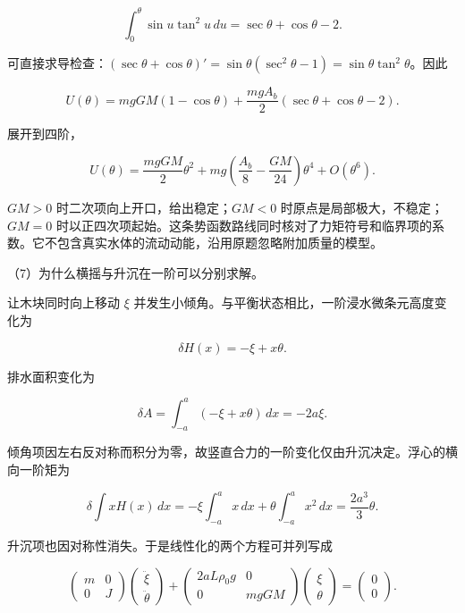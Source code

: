 \documentclass[12pt,a4paper,fontset=fandol]{ctexart}
\begin{document}
\[
\int_0^\theta\sin u\tan^2u\,du
=\sec\theta+\cos\theta-2.
\]

可直接求导检查：\((\sec\theta+\cos\theta)'=\sin\theta(\sec^2\theta-1)=\sin\theta\tan^2\theta\)。因此

\[
U(\theta)=mgGM(1-\cos\theta)
+\frac{mgA_b}{2}(\sec\theta+\cos\theta-2).
\]

展开到四阶，

\[
U(\theta)=\frac{mgGM}{2}\theta^2
+mg\left(\frac{A_b}{8}-\frac{GM}{24}\right)\theta^4
+O(\theta^6).
\]

\(GM>0\) 时二次项向上开口，给出稳定；\(GM<0\)
时原点是局部极大，不稳定；\(GM=0\)
时以正四次项起始。这条势函数路线同时核对了力矩符号和临界项的系数。它不包含真实水体的流动动能，沿用原题忽略附加质量的模型。

\par\noindent\begin{minipage}{\linewidth}
\setlength{\parindent}{2em}\setlength{\parskip}{.35em}
（7）为什么横摇与升沉在一阶可以分别求解。

让木块同时向上移动 \(\xi\)
并发生小倾角。与平衡状态相比，一阶浸水微条元高度变化为

\[
\delta H(x)=-\xi+x\theta.
\]

排水面积变化为

\[
\delta A=\int_{-a}^a(-\xi+x\theta)\,dx=-2a\xi.
\]

倾角项因左右反对称而积分为零，故竖直合力的一阶变化仅由升沉决定。浮心的横向一阶矩为

\[
\delta\int xH(x)\,dx
=-\xi\int_{-a}^a x\,dx+\theta\int_{-a}^a x^2\,dx
=\frac{2a^3}{3}\theta.
\]

升沉项也因对称性消失。于是线性化的两个方程可并列写成

\[
\begin{pmatrix}m&0\\0&J\end{pmatrix}
\begin{pmatrix}\ddot\xi\\\ddot\theta\end{pmatrix}
+
\begin{pmatrix}2aL\rho_0g&0\\0&mgGM\end{pmatrix}
\begin{pmatrix}\xi\\\theta\end{pmatrix}
=\begin{pmatrix}0\\0\end{pmatrix}.
\]


\end{minipage}
\end{document}

